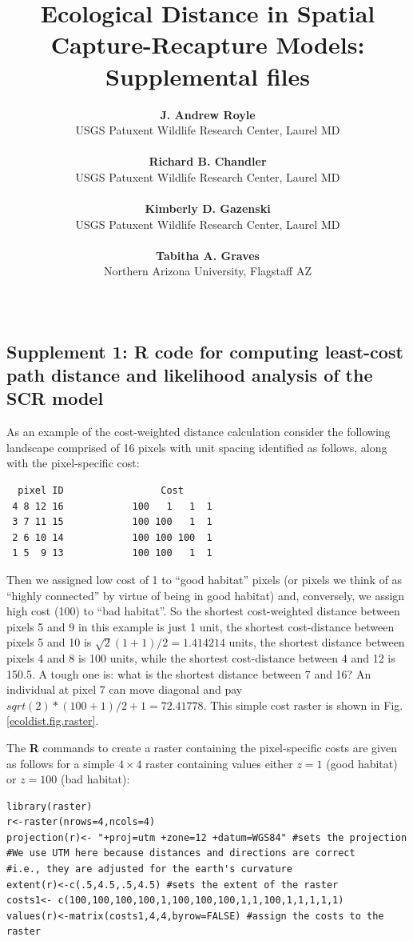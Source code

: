 \documentclass[12pt]{article}
\title{Ecological Distance in Spatial Capture-Recapture Models: Supplemental 
files}
\author{
{\bf J. Andrew Royle}\\
USGS Patuxent Wildlife Research Center, Laurel MD \\ \\
{\bf Richard B. Chandler} \\
USGS Patuxent Wildlife Research Center, Laurel MD\\ \\
{\bf Kimberly D. Gazenski} \\
USGS Patuxent Wildlife Research Center, Laurel MD\\ \\
{\bf Tabitha A. Graves} \\
Northern Arizona University, Flagstaff AZ \\ \\
}
\begin{document}
\maketitle

\date

\newpage

\linenumbers


\begin{spacing}{1.2}



\section*{Supplement 1: {\bf R} code for computing least-cost path
  distance and likelihood analysis of the SCR model}


As an example of the cost-weighted distance calculation consider the
following landscape comprised of 16 pixels with unit spacing
identified as follows, along with the pixel-specific cost:
\begin{center}
\begin{verbatim}
  pixel ID                 Cost
 4 8 12 16            100   1   1  1
 3 7 11 15            100 100   1  1
 2 6 10 14            100 100 100  1
 1 5  9 13            100 100   1  1
\end{verbatim}
\end{center}
Then we assigned low cost of 1 to ``good habitat'' pixels (or pixels
we think of as ``highly connected'' by virtue of being in good
habitat) and, conversely, we assign high cost (100) to ``bad
habitat''. So the shortest cost-weighted distance between pixels 5 and
9 in this example is just 1 unit, the shortest cost-distance between
pixels 5 and 10 is $\sqrt{2}(1+1)/2 = 1.414214$ units, the shortest
distance between pixels 4 and 8 is 100 units, while the shortest
cost-distance between 4 and 12 is 150.5. A tough one is: what is the
shortest distance between 7 and 16? An individual at pixel 7 can move
diagonal and pay $sqrt(2)*(100+1)/2 + 1 =72.41778$.  This simple cost
raster is shown in Fig. \ref{ecoldist.fig.raster}.

The {\bf R} commands to create a raster containing the pixel-specific
costs are given as follows for a simple $4\times 4$ raster containing
values either $z=1$ (good habitat) or $z=100$ (bad habitat):
\begin{verbatim}
library(raster)
r<-raster(nrows=4,ncols=4)
projection(r)<- "+proj=utm +zone=12 +datum=WGS84" #sets the projection
#We use UTM here because distances and directions are correct
#i.e., they are adjusted for the earth's curvature
extent(r)<-c(.5,4.5,.5,4.5) #sets the extent of the raster
costs1<- c(100,100,100,100,1,100,100,100,1,1,100,1,1,1,1,1)
values(r)<-matrix(costs1,4,4,byrow=FALSE) #assign the costs to the raster
\end{verbatim}



\end{spacing}
\end{document}
